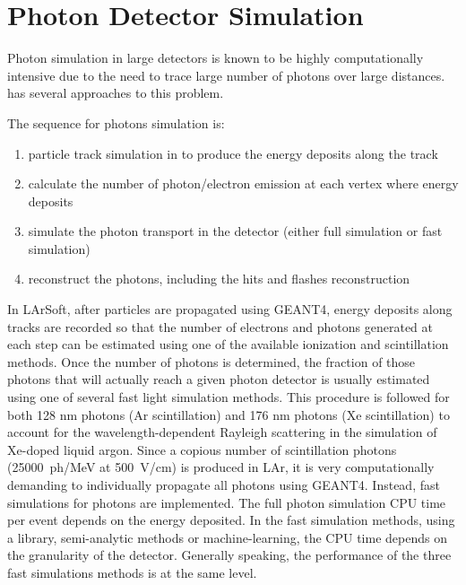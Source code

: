 \documentclass[../main-v1.tex]{subfiles}
\begin{document}
\section{Photon Detector Simulation}

Photon simulation in large detectors is known to be highly computationally intensive due to the need to trace large number of photons over large distances.   has several approaches to this problem. 

The sequence for photons simulation is:
\begin{enumerate}
\item particle track simulation in  to produce the energy deposits along the track
\item  calculate the number of photon/electron emission at each vertex where energy deposits
\item 
simulate the photon transport in the detector (either full simulation or fast simulation)
\item  reconstruct the photons, including the hits and flashes reconstruction
\end{enumerate}
 
In LArSoft, after particles are propagated using GEANT4, energy deposits along tracks are recorded so that the number of electrons and photons generated at each step can be estimated using one of the available  ionization and scintillation methods. Once the number of photons is determined, the fraction of those photons that will actually reach a given photon detector is usually estimated using one of several fast light simulation methods. This procedure is followed for both 128 nm photons (Ar scintillation) and 176 nm photons (Xe scintillation) to account for the wavelength-dependent Rayleigh scattering in the simulation of Xe-doped liquid argon. 
Since a copious number of scintillation photons (25000~ph/MeV at 500~V/cm) is produced in LAr, it is very computationally demanding to individually propagate all photons using GEANT4. Instead,  fast simulations for photons are implemented.
The full   photon simulation CPU time per event depends on the energy deposited. 
In the fast simulation methods, using a library,  semi-analytic methods or machine-learning, the CPU time depends on the granularity of the detector. Generally speaking, the performance of the three fast simulations methods is at the same level. 
 
\end{document}
